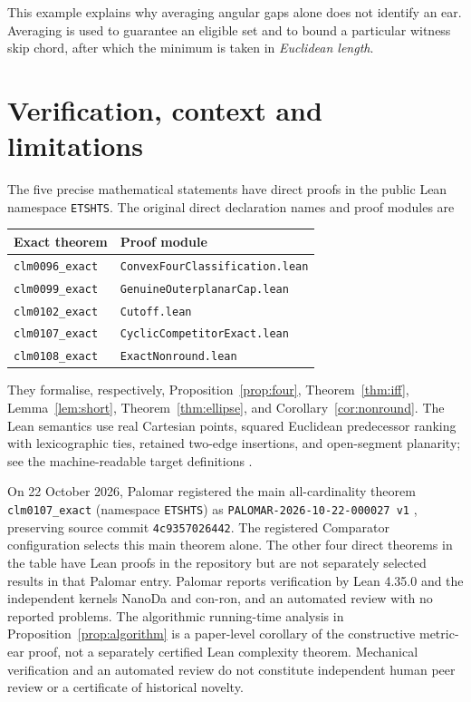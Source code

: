 \documentclass[11pt,a4paper]{article}
\theoremstyle{definition}\newtheorem{definition}[theorem]{Definition}
\theoremstyle{remark}\newtheorem{remark}[theorem]{Remark}
\begin{document}
This example explains why averaging angular gaps alone does not identify an ear. Averaging is used to guarantee an eligible set and to bound a particular witness skip chord, after which the minimum is taken in \emph{Euclidean length}.

\section{Verification, context and limitations}\label{sec:verify}
The five precise mathematical statements have direct proofs in the public Lean namespace \texttt{ETSHTS}. The original direct declaration names and proof modules are
\begin{center}\small
\begin{tabular}{@{}ll@{}}\toprule
\textbf{Exact theorem} & \textbf{Proof module} \\\midrule
\texttt{clm0096\_exact} & \texttt{ConvexFourClassification.lean}\\
\texttt{clm0099\_exact} & \texttt{GenuineOuterplanarCap.lean}\\
\texttt{clm0102\_exact} & \texttt{Cutoff.lean}\\
\texttt{clm0107\_exact} & \texttt{CyclicCompetitorExact.lean}\\
\texttt{clm0108\_exact} & \texttt{ExactNonround.lean}\\\bottomrule
\end{tabular}
\end{center}
They formalise, respectively, Proposition~\ref{prop:four}, Theorem~\ref{thm:iff}, Lemma~\ref{lem:short}, Theorem~\ref{thm:ellipse}, and Corollary~\ref{cor:nonround}. The Lean semantics use real Cartesian points, squared Euclidean predecessor ranking with lexicographic ties, retained two-edge insertions, and open-segment planarity; see the machine-readable target definitions \citep{etshtsrepo}.

On 22 October 2026, Palomar registered the main all-cardinality theorem \texttt{clm0107\_exact} (namespace \texttt{ETSHTS}) as \texttt{PALOMAR-2026-10-22-000027 v1} \citep{palomar2026ellipse}, preserving source commit \texttt{4c9357026442}. The registered Comparator configuration selects this main theorem alone. The other four direct theorems in the table have Lean proofs in the repository but are not separately selected results in that Palomar entry. Palomar reports verification by Lean 4.35.0 and the independent kernels NanoDa and con-ron, and an automated review with no reported problems. The algorithmic running-time analysis in Proposition~\ref{prop:algorithm} is a paper-level corollary of the constructive metric-ear proof, not a separately certified Lean complexity theorem. Mechanical verification and an automated review do not constitute independent human peer review or a certificate of historical novelty.
\end{document}
